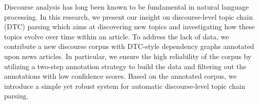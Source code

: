Discourse analysis has long been known to be fundamental in natural language processing. In this research, we present our insight on discourse-level topic chain (DTC) parsing which aims at discovering new topics and investigating how these topics evolve over time within an article. To address the lack of data, we contribute a new discourse corpus with DTC-style dependency graphs annotated upon news articles. In particular, we ensure the high reliability of the corpus by utilizing a two-step annotation strategy to build the data and filtering out the annotations with low confidence scores. Based on the annotated corpus, we introduce a simple yet robust system for automatic discourse-level topic chain parsing.
